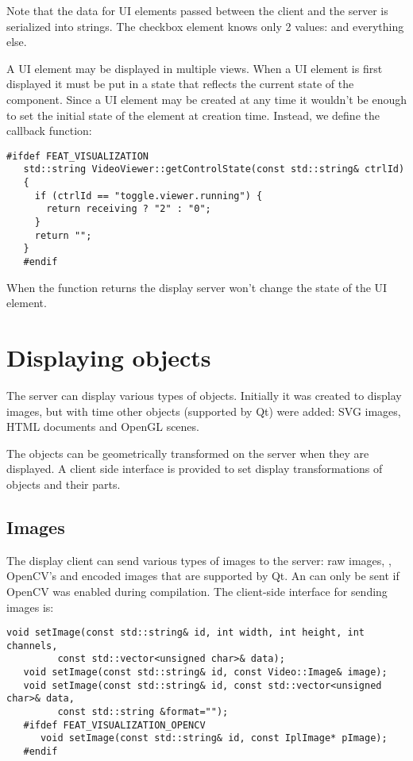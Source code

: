 Note that the data for UI elements passed between the client and the server is
serialized into strings. The checkbox element knows only 2 values: 
and everything else.

A UI element may be displayed in multiple views. When a UI element is first
displayed it must be put in a state that reflects the current state of the
component.  Since a UI element may be created at any time it wouldn't be enough
to set the initial state of the element at creation time. Instead, we define
the  callback function:

\begin{Verbatim}[fontsize=\scriptsize,gobble=3]
   #ifdef FEAT_VISUALIZATION
   std::string VideoViewer::getControlState(const std::string& ctrlId)
   {
     if (ctrlId == "toggle.viewer.running") {
       return receiving ? "2" : "0";
     }
     return "";
   }
   #endif
\end{Verbatim}

When the function returns  the display server won't change the state
of the UI element.

\section{Displaying objects}

The server can display various types of objects. Initially it was created to
display images, but with time other objects (supported by Qt) were added:
SVG images, HTML documents and OpenGL scenes.

The objects can be geometrically transformed on the server when they are
displayed. A client side interface is provided to set display transformations
of objects and their parts.

\subsection{Images}

The display client can send various types of images to the server: raw images, 
, OpenCV's  and encoded images that are
supported by Qt. An  can only be sent if OpenCV was enabled
during compilation.
The client-side interface for sending images is:

\begin{Verbatim}[fontsize=\scriptsize,gobble=3]
   void setImage(const std::string& id, int width, int height, int channels,
         const std::vector<unsigned char>& data);
   void setImage(const std::string& id, const Video::Image& image); 
   void setImage(const std::string& id, const std::vector<unsigned char>& data,
         const std::string &format=""); 
   #ifdef FEAT_VISUALIZATION_OPENCV
      void setImage(const std::string& id, const IplImage* pImage); 
   #endif
\end{Verbatim}

